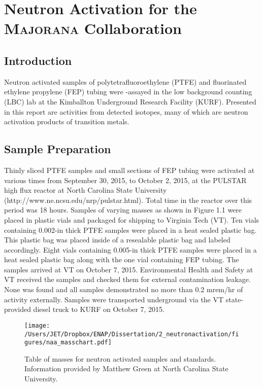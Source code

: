 \chapter{Neutron Activation for the \textsc{Majorana} Collaboration}
\section{Introduction}

Neutron activated samples of polytetrafluoroethylene (PTFE) and fluorinated ethylene propylene (FEP) tubing were \textgamma-assayed in the low background counting (LBC) lab at the Kimballton Underground Research Facility (KURF).  Presented in this report are activities from detected isotopes, many of which are neutron activation products of transition metals.

\section{Sample Preparation}

Thinly sliced PTFE samples and small sections of FEP tubing were activated at various times from September 30, 2015, to October 2, 2015, at the PULSTAR high flux reactor at North Carolina State University (http://www.ne.ncsu.edu/nrp/pulstar.html).  Total time in the reactor over this period was 18 hours.  Samples of varying masses as shown in Figure 1.1 were placed in plastic vials and packaged for shipping to Virginia Tech (VT).  Ten vials containing 0.002-in thick PTFE samples were placed in a heat sealed plastic bag.  This plastic bag was placed inside of a resealable plastic bag and labeled accordingly.  Eight vials containing 0.005-in thick PTFE samples were placed in a heat sealed plastic bag along with the one vial containing FEP tubing.  The samples arrived at VT on October 7, 2015.  Environmental Health and Safety at VT received the samples and checked them for external contamination leakage.  None was found and all samples demonstrated no more than 0.2 mrem/hr of activity externally.  Samples were transported underground via the VT state-provided diesel truck to KURF on October 7, 2015.

\begin{figure}[htbp]
\centering
\texttt{[image: /Users/JET/Dropbox/ENAP/Dissertation/2\_neutronactivation/figures/naa\_masschart.pdf]}
\caption[%
Table of masses for neutron activated samples and standards.  
]{%
Table of masses for neutron activated samples and standards.  Information provided by Matthew Green at North Carolina State University.
\label{fig:mjd_cryostat}} 
\end{figure}

